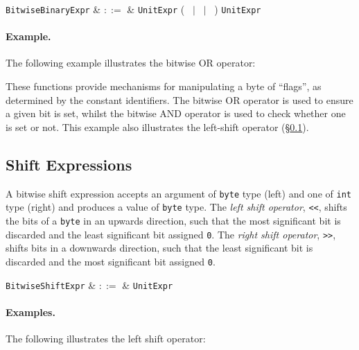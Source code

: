 \begin{syntax}
  \verb+BitwiseBinaryExpr+ & $::=$ & \verb+UnitExpr+ \big(\ \token{\&} $|$ \token{|}\ $|$ \token{\^}\ \big) \verb+UnitExpr+\\
\end{syntax}

\paragraph{Example.}  The following example illustrates the bitwise OR operator:



These functions provide mechanisms for manipulating a byte of ``flags'', as determined by the constant identifiers.  The bitwise OR operator is used to ensure a given bit is set, whilst the bitwise AND operator is used to check whether one is set or not.  This example also illustrates the left-shift operator (\S\ref{c_expr_shift}).


\subsection{Shift Expressions}
\label{c_expr_shift}

A bitwise shift expression accepts an argument of \lstinline{byte} type (left) and one of \lstinline{int} type (right) and produces a value of \lstinline{byte} type.  The {\em left shift operator}, \lstinline{<<}, shifts the bits of a \lstinline{byte} in an upwards direction, such that the most significant bit is discarded and the least significant bit assigned \lstinline{0}.  The {\em right shift operator}, \lstinline{>>}, shifts bits in a downwards direction, such that the least significant bit is discarded and the most significant bit assigned \lstinline{0}.  

\begin{syntax}
  \verb+BitwiseShiftExpr+ & $::=$ & \verb+UnitExpr+\ 
\end{syntax}

\paragraph{Examples.} The following illustrates the left shift operator:

